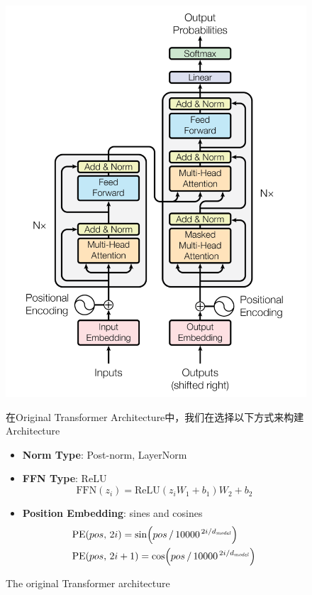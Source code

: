 \begin{figure}[htbp]
  \centering
  \begin{minipage}{0.45\linewidth}
    \includegraphics[width=\linewidth]{figs/lec3/lec3.01.png}
    \caption{The original Transformer architecture}
  \end{minipage}
  \hfill
  \begin{minipage}{0.5\linewidth}
    \small
    在Original Transformer Architecture中，我们在选择以下方式来构建Architecture
    \begin{itemize}
    \item \textbf{Norm Type}: Post-norm, LayerNorm
    \item \textbf{FFN Type}: ReLU \\
        \[
        \text{FFN}(z_i) = \text{ReLU}(z_i W_1 + b_1) W_2 + b_2
        \]
    \item \textbf{Position Embedding}: sines and cosines \\
    \begin{align*}
     &\mathrm{PE}(pos,\, 2i)   = \sin \Bigl( pos \,/\, 10000^{\,2i / d_{\mathit{model}}} \Bigr)\\
     &\mathrm{PE}(pos,\, 2i+1) = \cos \Bigl( pos \,/\, 10000^{\,2i / d_{\mathit{model}}} \Bigr)
    \end{align*}

    \end{itemize}

  \end{minipage}
\end{figure}

